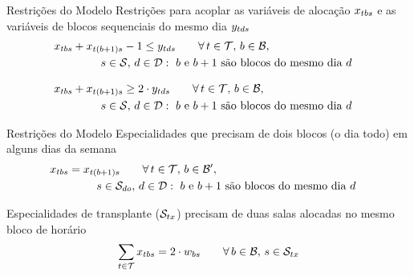 \documentclass[10pt]{beamer}
\begin{document}
\begin{frame}{Restrições do Modelo}
    Restrições para acoplar as variáveis de alocação $x_{tbs}$ e as variáveis de blocos sequenciais do mesmo dia $y_{tds}$
    \begin{align}
    \label{eq:m2-8}
        &x_{tbs} + x_{t(b+1)s} - 1 \leq y_{tds} \hspace{2em} \forall\, t \in \mathcal{T},\, b \in \mathcal{B},&\\
        & \hspace{4em}\,s \in \mathcal{S},\, d \in \mathcal{D} : \text{ $b$ e $b+1$ são blocos do mesmo dia $d$}&\nonumber
    \end{align}

    \begin{align}
    \label{eq:m2-9}
        &x_{tbs} + x_{t(b+1)s} \geq 2 \cdot y_{tds} \hspace{2em} \forall\, t \in \mathcal{T},\, b \in \mathcal{B},&\\
        &\hspace{4em}\,s \in \mathcal{S},\, d \in \mathcal{D} : \text{ $b$ e $b+1$ são blocos do mesmo dia $d$}&\nonumber
    \end{align}
\end{frame}


\begin{frame}{Restrições do Modelo}
    Especialidades que precisam de dois blocos (o dia todo) em alguns dias da semana
    \begin{align}
    \label{eq:m2-10}
        &x_{tbs} = x_{t(b+1)s} \hspace{2em} \forall\, t \in \mathcal{T},\, b \in \mathcal{B'},&\\
        &\hspace{4em}\,s \in \mathcal{S}_{do},\, d \in \mathcal{D} : \text{ $b$ e $b+1$ são blocos do mesmo dia $d$}&\nonumber
    \end{align}
    \vspace{2em}

    Especialidades de transplante ($\mathcal{S}_{tx}$) precisam de duas salas alocadas no mesmo bloco de horário
    \begin{equation}
    \label{eq:m2-11}
        \sum_{t \in \mathcal{T}} x_{tbs} = 2 \cdot w_{bs} \hspace{2em} \forall\, b \in \mathcal{B},\, s \in \mathcal{S}_{tx}
    \end{equation}
\end{frame}
\end{document}
